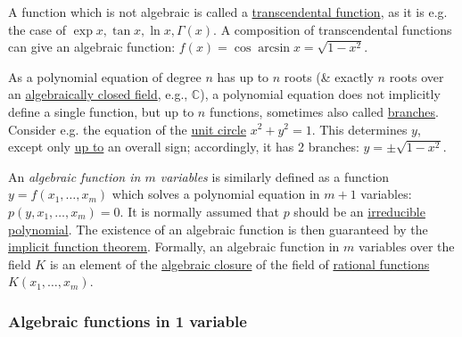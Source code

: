 \documentclass{article}
\begin{document}
A function which is not algebraic is called a \href{https://en.wikipedia.org/wiki/Transcendental_function}{transcendental function}, as it is e.g. the case of $\exp x,\tan x,\ln x,\Gamma(x)$. A composition of transcendental functions can give an algebraic function: $f(x) = \cos\arcsin x = \sqrt{1 - x^2}$.

As a polynomial equation of degree $n$ has up to $n$ roots (\& exactly $n$ roots over an \href{https://en.wikipedia.org/wiki/Algebraically_closed_field}{algebraically closed field}, e.g., $\mathbb{C}$), a polynomial equation does not implicitly define a single function, but up to $n$ functions, sometimes also called \href{https://en.wikipedia.org/wiki/Branch_cut}{branches}. Consider e.g. the equation of the \href{https://en.wikipedia.org/wiki/Unit_circle}{unit circle} $x^2 + y^2 = 1$. This determines $y$, except only \href{https://en.wikipedia.org/wiki/Up_to}{up to} an overall sign; accordingly, it has 2 branches: $y = \pm\sqrt{1 - x^2}$.

An {\it algebraic function in $m$ variables} is similarly defined as a function $y = f(x_1,\ldots,x_m)$ which solves a polynomial equation in $m + 1$ variables: $p(y,x_1,\ldots,x_m) = 0$. It is normally assumed that $p$ should be an \href{https://en.wikipedia.org/wiki/Irreducible_polynomial}{irreducible polynomial}. The existence of an algebraic function is then guaranteed by the \href{https://en.wikipedia.org/wiki/Implicit_function_theorem}{implicit function theorem}. Formally, an algebraic function in $m$ variables over the field $K$ is an element of the \href{https://en.wikipedia.org/wiki/Algebraic_closure}{algebraic closure} of the field of \href{https://en.wikipedia.org/wiki/Rational_function}{rational functions} $K(x_1,\ldots,x_m)$.

\subsubsection{Algebraic functions in 1 variable}
\end{document}
